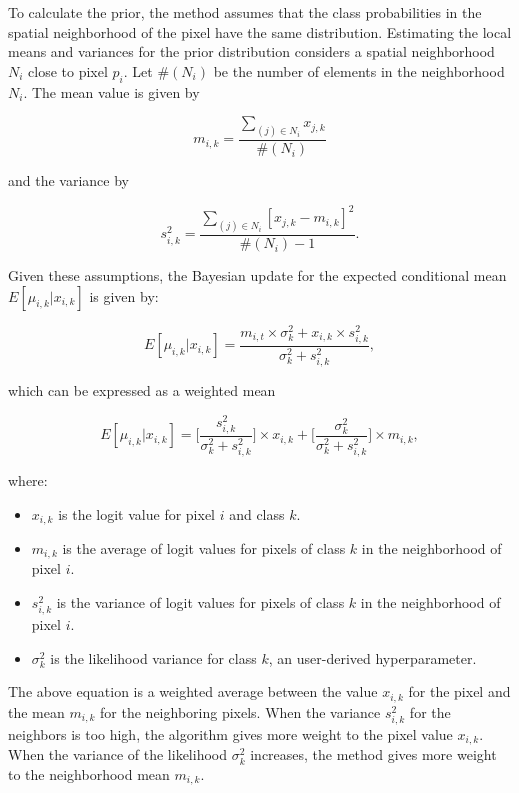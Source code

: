 \documentclass[
  shortnames]{jss}
\begin{document}
To calculate the prior, the method assumes that the class probabilities in the spatial neighborhood of the pixel have the same distribution. Estimating the local means and variances for the prior distribution considers a spatial neighborhood \(N_{i}\) close to pixel \(p_i\). Let \(\#(N_{i})\) be the number of elements in the neighborhood \(N_{i}\). The mean value is given by

\begin{equation}
m_{i,k} = \frac{\sum_{(j) \in N_{i}} x_{j,k}}{\#(N_{i})}
\end{equation}

and the variance by

\begin{equation}
s^2_{i,k} = \frac{\sum_{(j) \in N_{i}} [x_{j,k} - m_{i,k}]^2}{\#(N_{i})-1}.
\end{equation}

Given these assumptions, the Bayesian update for the expected conditional mean
\({E}[\mu_{i,k} | x_{i,k}]\) is given by:

\begin{equation}
{E}[\mu_{i,k} | x_{i,k}] = \frac{m_{i,t} \times \sigma^2_{k} +
x_{i,k} \times s^2_{i,k}}{ \sigma^2_{k} +s^2_{i,k}},
\end{equation}

which can be expressed as a weighted mean

\begin{equation}
{E}[\mu_{i,k} | x_{i,k}] =
\Biggl [ \frac{s^2_{i,k}}{\sigma^2_{k} +s^2_{i,k}} \Biggr ] \times
x_{i,k} +
\Biggl [ \frac{\sigma^2_{k}}{\sigma^2_{k} +s^2_{i,k}} \Biggr ] \times m_{i,k},
\end{equation}

where:

\begin{itemize}
\item $x_{i,k}$ is the logit value for pixel $i$ and class $k$.
\item $m_{i,k}$ is the average of logit values for pixels of class $k$ 
in the neighborhood of pixel $i$.
\item $s^2_{i,k}$ is the variance of logit values for pixels of class $k$ 
in the neighborhood of pixel $i$.
\item $\sigma^2_{k}$ is the likelihood variance for class $k$, 
an user-derived hyperparameter.
\end{itemize}

The above equation is a weighted average between the value \(x_{i,k}\) for the pixel and the mean \(m_{i,k}\) for the neighboring pixels. When the variance \(s^2_{i,k}\) for the neighbors is too high, the algorithm gives more weight to the pixel value \(x_{i,k}\). When the variance of the likelihood \(\sigma^2_k\) increases, the method gives more weight to the neighborhood mean \(m_{i,k}\).
\end{document}
